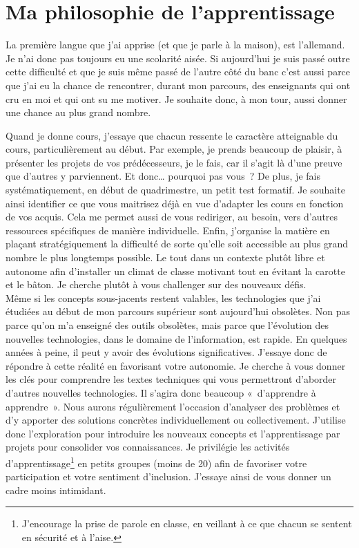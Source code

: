 \clearpage
\section{Ma philosophie de l'apprentissage}

La première langue que j'ai apprise (et que je parle à la maison), est l'allemand. Je n'ai donc pas toujours eu une scolarité aisée. Si aujourd'hui je suis passé outre cette difficulté et que je suis même passé de l'autre côté du banc c'est aussi parce que j'ai eu la chance de rencontrer, durant mon parcours, des enseignants qui ont cru en moi et qui ont su me motiver. Je souhaite donc, à mon tour, aussi donner une chance au plus grand nombre.

Quand je donne cours, j’essaye que chacun ressente le caractère atteignable du cours, particulièrement au début. Par exemple, je prends beaucoup de plaisir, à présenter les projets de vos prédécesseurs, je le fais, car il s’agit là d’une preuve que d’autres y parviennent. Et donc… pourquoi pas vous~? De plus, je fais systématiquement, en début de quadrimestre, un petit test formatif. Je souhaite ainsi identifier ce que vous maitrisez déjà en vue d’adapter les cours en fonction de vos acquis. Cela me permet aussi de vous rediriger, au besoin, vers d'autres ressources spécifiques de manière individuelle. Enfin, j'organise la matière en plaçant stratégiquement la difficulté de sorte qu'elle soit accessible au plus grand nombre le plus longtemps possible. Le tout dans un contexte plutôt libre et autonome afin d'installer un climat de classe motivant tout en évitant la carotte et le bâton. Je cherche plutôt à vous challenger sur des nouveaux défis.\\

Même si les concepts sous-jacents restent valables, les technologies que j'ai étudiées au début de mon parcours supérieur sont aujourd'hui obsolètes. Non pas parce qu'on m'a enseigné des outils obsolètes, mais parce que l'évolution des nouvelles technologies, dans le domaine de l'information, est rapide. En quelques années à peine, il peut y avoir des évolutions significatives. J’essaye donc de répondre à cette réalité en favorisant votre autonomie. Je cherche à vous donner les clés pour comprendre les textes techniques qui vous permettront d’aborder d’autres nouvelles technologies. Il s’agira donc beaucoup «~d’apprendre à apprendre~». Nous aurons régulièrement l’occasion d’analyser des problèmes et d’y apporter des solutions concrètes individuellement ou collectivement. J’utilise donc l'exploration pour introduire les nouveaux concepts et l’apprentissage par projets pour consolider vos connaissances. Je privilégie les activités d’apprentissage\footnote{J'encourage la prise de parole en classe, en veillant à ce que chacun se sentent en sécurité et à l'aise.} en petits groupes (moins de 20) afin de favoriser votre participation et votre sentiment d’inclusion. J’essaye ainsi de vous donner un cadre moins intimidant.


